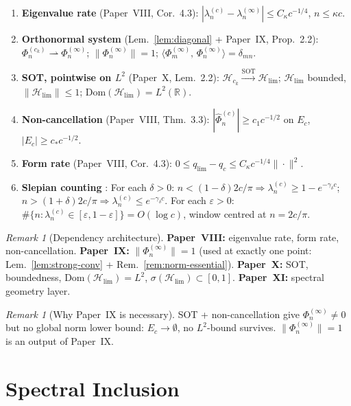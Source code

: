 \documentclass[12pt,a4paper]{amsart}
\theoremstyle{definition}
\theoremstyle{remark}
\newtheorem{remark}[theorem]{Remark}
\newcommand{\Phihat}{\widehat{\Phi}}
\newcommand{\ip}[2]{\langle #1,\, #2\rangle}
\newcommand{\Hlim}{\mathcal{H}_{\lim}}
\newcommand{\Dom}{\mathrm{Dom}}
\begin{document}
\begin{enumerate}[(XI.1)]
\item\label{XI1}
  \textbf{Eigenvalue rate} (Paper~VIII, Cor.~4.3):
  $|\lambda_n^{(c)}-\lambda_n^{(\infty)}|
  \le C_\kappa c^{-1/4}$, $n\le\kappa c$.
\item\label{XI2}
  \textbf{Orthonormal system}
  (Lem.~\ref{lem:diagonal} + Paper~IX, Prop.~2.2):
  $\Phi_n^{(c_k)}\rightharpoonup\Phi_n^{(\infty)}$;
  $\|\Phi_n^{(\infty)}\|=1$;
  $\ip{\Phi_m^{(\infty)}}{\Phi_n^{(\infty)}}
  =\delta_{mn}$.
\item\label{XI3}
  \textbf{SOT, pointwise on $L^2$}
  (Paper~X, Lem.~2.2):
  $\mathcal{H}_{c_k}
  \xrightarrow{\mathrm{SOT}}\Hlim$;
  $\Hlim$ bounded, $\|\Hlim\|\le 1$;
  $\Dom(\Hlim)=L^2(\mathbb{R})$.
\item\label{XI4}
  \textbf{Non-cancellation} (Paper~VIII, Thm.~3.3):
  $|\Phihat_n^{(c)}|\ge c_1 c^{-1/2}$ on
  $E_c$, $|E_c|\ge c_*c^{-1/2}$.
\item\label{XI5}
  \textbf{Form rate} (Paper~VIII, Cor.~4.3):
  $0\le q_{\lim}-q_c
  \le C_\kappa c^{-1/4}\|{\cdot}\|^2$.
\item\label{XI6}
  \textbf{Slepian counting}
  \cite{Slepian1961,Osipov2013}:
  For each $\delta>0$:
  $n<(1{-}\delta)2c/\pi
  \Rightarrow\lambda_n^{(c)}\ge 1-e^{-\gamma_\delta c}$;
  $n>(1{+}\delta)2c/\pi
  \Rightarrow\lambda_n^{(c)}\le e^{-\gamma_\delta c}$.
  For each $\varepsilon>0$:
  $\#\{n:\lambda_n^{(c)}
  \in[\varepsilon,1{-}\varepsilon]\}
  =O(\log c)$,
  window centred at $n=2c/\pi$.
\end{enumerate}

\begin{remark}[Dependency architecture]
\textbf{Paper~VIII:} eigenvalue rate, form rate,
non-cancellation.
\textbf{Paper~IX:} $\|\Phi_n^{(\infty)}\|=1$
(used at exactly one point:
Lem.~\ref{lem:strong-conv} +
Rem.~\ref{rem:norm-essential}).
\textbf{Paper~X:} SOT, boundedness,
$\Dom(\Hlim)=L^2$, $\sigma(\Hlim)\subset[0,1]$.
\textbf{Paper~XI:} spectral geometry layer.
\end{remark}

\begin{remark}[Why Paper~IX is necessary]
SOT + non-cancellation give $\Phi_n^{(\infty)}\ne 0$
but no global norm lower bound:
$E_c\to\emptyset$, no $L^2$-bound survives.
$\|\Phi_n^{(\infty)}\|=1$ is an output of Paper~IX.
\end{remark}

\section{Spectral Inclusion}
\label{sec:spectral-inclusion}
\end{document}
